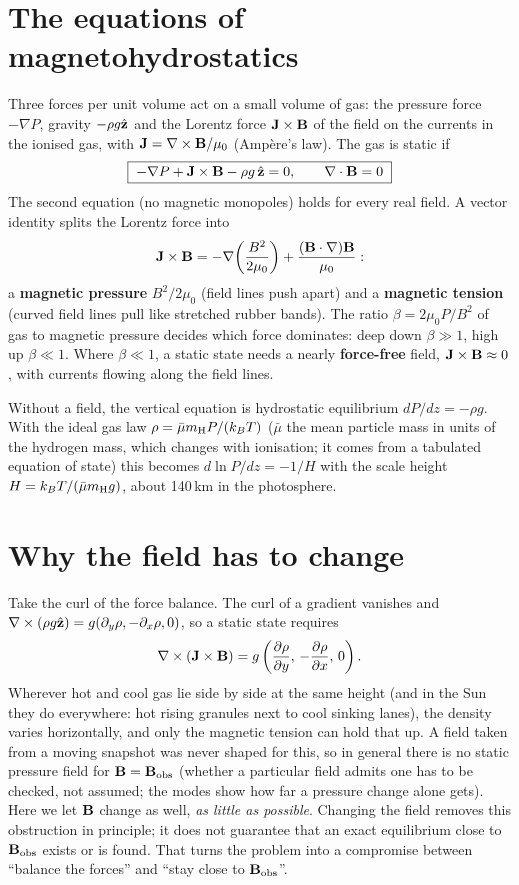 \section{The equations of magnetohydrostatics}
Three forces per unit volume act on a small volume of gas: the pressure force $-\nabla P$, gravity $-\rho g\hat{\mathbf z}$ and the
Lorentz force $\mathbf J\times\mathbf B$ of the field on the currents in the ionised gas, with $\mathbf J=\nabla\times\mathbf B/\mu_0$ (Amp\`ere's law).
The gas is static if
\[
\boxed{\;-\nabla P+\mathbf J\times\mathbf B-\rho g\,\hat{\mathbf z}=0,\qquad \nabla\cdot\mathbf B=0\;}
\]
The second equation (no magnetic monopoles) holds for every real field. A vector identity splits the Lorentz force into
\[
\mathbf J\times\mathbf B=-\nabla\!\left(\frac{B^2}{2\mu_0}\right)+\frac{(\mathbf B\cdot\nabla)\mathbf B}{\mu_0}:
\]
a \textbf{magnetic pressure} $B^2/2\mu_0$ (field lines push apart) and a \textbf{magnetic tension} (curved field lines pull
like stretched rubber bands). The ratio $\beta=2\mu_0P/B^2$ of gas to magnetic pressure decides which force dominates: deep
down $\beta\gg1$, high up $\beta\ll1$. Where $\beta\ll1$, a static state needs a nearly \textbf{force-free} field,
$\mathbf J\times\mathbf B\approx0$, with currents flowing along the field lines.

Without a field, the vertical equation is hydrostatic equilibrium $dP/dz=-\rho g$. With the ideal gas law
$\rho=\bar\mu m_{\rm H}P/(k_BT)$ ($\bar\mu$ the mean particle mass in units of the hydrogen mass, which changes with
ionisation; it comes from a tabulated equation of state) this becomes $d\ln P/dz=-1/H$ with the scale height
$H=k_BT/(\bar\mu m_{\rm H}g)$, about 140\,km in the photosphere.

\section{Why the field has to change}
Take the curl of the force balance. The curl of a gradient vanishes and $\nabla\times(\rho g\hat{\mathbf z})=g(\partial_y\rho,-\partial_x\rho,0)$,
so a static state requires
\[
\nabla\times(\mathbf J\times\mathbf B)=g\left(\frac{\partial\rho}{\partial y},\,-\frac{\partial\rho}{\partial x},\,0\right).
\]
Wherever hot and cool gas lie side by side at the same height (and in the Sun they do everywhere: hot rising granules next
to cool sinking lanes), the density varies horizontally, and only the magnetic tension can hold that up. A field taken from a
moving snapshot was never shaped for this, so in general there is no static pressure field for $\mathbf B=\mathbf B_{\rm obs}$ (whether a
particular field admits one has to be checked, not assumed; the  modes show how far a pressure change
alone gets). Here we let $\mathbf B$ change as well, \emph{as little as possible}. Changing the field removes this obstruction in
principle; it does not guarantee that an exact equilibrium close to $\mathbf B_{\rm obs}$ exists or is found. That turns the
problem into a compromise between ``balance the forces'' and ``stay close to $\mathbf B_{\rm obs}$''.


